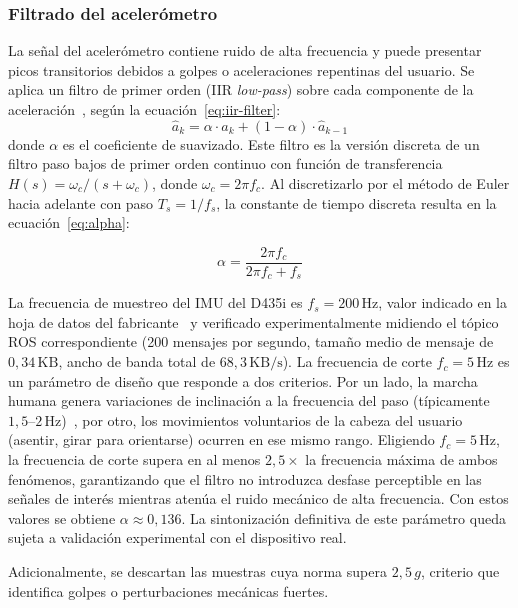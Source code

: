 \subsubsection{Filtrado del acelerómetro}

La señal del acelerómetro contiene ruido de alta frecuencia y puede presentar
picos transitorios debidos a golpes o aceleraciones repentinas del usuario.
Se aplica un filtro de primer orden (IIR \textit{low-pass}) sobre cada componente
de la aceleración~\cite{oppenheim1999dsp}, según la ecuación~\ref{eq:iir-filter}:
\begin{equation}
  \label{eq:iir-filter}
  \hat{a}_k = \alpha \cdot a_k + (1 - \alpha) \cdot \hat{a}_{k-1}
\end{equation}
donde $\alpha$ es el coeficiente de suavizado. Este filtro es la versión
discreta de un filtro paso bajos de primer orden continuo con función de
transferencia $H(s) = \omega_c / (s + \omega_c)$, donde
$\omega_c = 2\pi f_c$. Al discretizarlo por el método de Euler hacia
adelante con paso $T_s = 1/f_s$, la constante de tiempo discreta resulta en
la ecuación~\ref{eq:alpha}:

\begin{equation}
  \label{eq:alpha}
  \alpha = \frac{2\pi f_c}{2\pi f_c + f_s}
\end{equation}

La frecuencia de muestreo del IMU del D435i es $f_s = 200\,\text{Hz}$,
valor indicado en la hoja de datos del fabricante~\cite{RS-D400} y verificado
experimentalmente midiendo el tópico ROS correspondiente (200 mensajes por
segundo, tamaño medio de mensaje de $0{,}34\,\text{KB}$, ancho de banda
total de $68{,}3\,\text{KB/s}$). La frecuencia de corte $f_c = 5\,\text{Hz}$
es un parámetro de diseño que responde a dos criterios. Por un lado, la
marcha humana genera variaciones de inclinación a la frecuencia del paso
(típicamente $1{,}5$--$2\,\text{Hz}$)~\cite{menz2003acceleration}, por otro,
los movimientos voluntarios de la cabeza del usuario (asentir, girar para
orientarse) ocurren en ese mismo rango. Eligiendo $f_c = 5\,\text{Hz}$, la
frecuencia de corte supera en al menos $2{,}5\times$ la frecuencia máxima
de ambos fenómenos, garantizando que el filtro no introduzca desfase
perceptible en las señales de interés mientras atenúa el ruido mecánico de
alta frecuencia. Con estos
valores se obtiene $\alpha \approx 0{,}136$. La sintonización definitiva de
este parámetro queda sujeta a validación experimental con el dispositivo real.

Adicionalmente, se descartan las muestras cuya norma supera $2{,}5\,g$,
criterio que identifica golpes o perturbaciones mecánicas fuertes.

